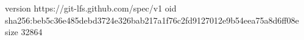 version https://git-lfs.github.com/spec/v1
oid sha256:beb5c36e485debd3724e326bab217a1f76c2fd9127012e9b54eea75a8d6ff08e
size 32864
